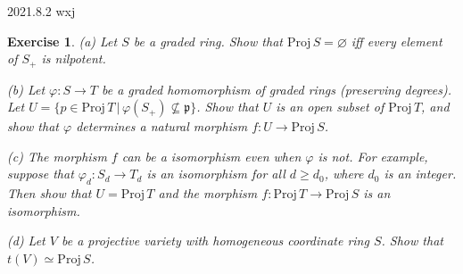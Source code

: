 \documentclass{amsart}
\newtheorem{exe}{Exercise}[subsection]
\begin{document}
2021.8.2 wxj

\begin{exe}
	\label{2.2.14}
   (a) Let $S$ be a graded ring. Show that $\mathrm{Proj}\, S = \varnothing$ iff every element of $S_{+}$ is nilpotent.
   
   (b) Let $\varphi  : S \to T$ be a graded homomorphism of graded rings (preserving degrees). Let $U = \{ p \in \mathrm{Proj}\, T\, |\, \varphi(S_{+}) \not\subseteq \mathfrak{p} \}$. Show that $U$ is an open subset of $\mathrm{Proj}\, T$, and show that $\varphi$ determines a natural morphism $f : U \to \mathrm{Proj}\, S$.
   
   (c) The morphism $f$ can be a isomorphism even when $\varphi$ is not. For example, suppose that $\varphi_{d} : S_{d} \to T_{d}$ is an isomorphism for all $d \geq d_{0}$, where $d_{0}$ is an integer. Then show that $U = \mathrm{Proj}\, T$ and the morphism $f : \mathrm{Proj}\, T \to \mathrm{Proj}\, S$ is an isomorphism.
   
   (d) Let $V$ be a projective variety with homogeneous coordinate ring $S$. Show that $t(V) \simeq \mathrm{Proj}\, S$.
\end{exe}
\end{document}
